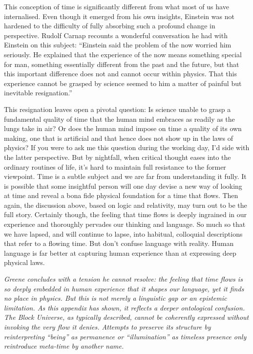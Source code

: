 \documentclass[12pt]{book}
\begin{document}
This conception of time is significantly different from what most of us have internalised. Even though it emerged from his own insights, Einstein was not hardened to the difficulty of fully absorbing such a profound change in perspective. Rudolf Carnap recounts a wonderful conversation he had with Einstein on this subject: ``Einstein said the problem of the now worried him seriously. He explained that the experience of the now means something special for man, something essentially different from the past and the future, but that this important difference does not and cannot occur within physics. That this experience cannot be grasped by science seemed to him a matter of painful but inevitable resignation.''

This resignation leaves open a pivotal question: Is science unable to grasp a fundamental quality of time that the human mind embraces as readily as the lungs take in air? Or does the human mind impose on time a quality of its own making, one that is artificial and that hence does not show up in the laws of physics? If you were to ask me this question during the working day, I'd side with the latter perspective. But by nightfall, when critical thought eases into the ordinary routines of life, it's hard to maintain full resistance to the former viewpoint. Time is a subtle subject and we are far from understanding it fully. It is possible that some insightful person will one day devise a new way of looking at time and reveal a bona fide physical foundation for a time that flows. Then again, the discussion above, based on logic and relativity, may turn out to be the full story. Certainly though, the feeling that time flows is deeply ingrained in our experience and thoroughly pervades our thinking and language. So much so that we have lapsed, and will continue to lapse, into habitual, colloquial descriptions that refer to a flowing time. But don't confuse language with reality. Human language is far better at capturing human experience than at expressing deep physical laws.\\
\vspace{0.1pt}\hrulefill

\noindent\textit{Greene concludes with a tension he cannot resolve: the feeling that time flows is so deeply embedded in human experience that it shapes our language, yet it finds no place in physics. But this is not merely a linguistic gap or an epistemic limitation. As this appendix has shown, it reflects a deeper ontological confusion. The Block Universe, as typically described, cannot be coherently expressed without invoking the very flow it denies. Attempts to preserve its structure by reinterpreting ``being'' as permanence or ``illumination'' as timeless presence only reintroduce meta-time by another name.}
\end{document}
